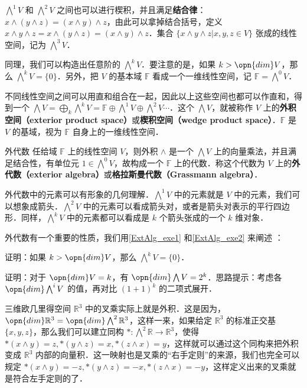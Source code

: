$\bigwedge^1 V$ 和 $\bigwedge^2 V$ 之间也可以进行楔积，并且满足\textbf{结合律}：$x\wedge(y\wedge z)=(x\wedge y)\wedge z$，由此可以拿掉结合括号，定义 $x\wedge y\wedge z=x\wedge(y\wedge z)=(x\wedge y)\wedge z$．集合 $\{x\wedge y\wedge z|x, y, z\in V\}$ 张成的线性空间，记为 $\bigwedge^3 V$．

同理，我们可以构造出任意阶的 $\bigwedge^k V$．要注意的是，如果 $k>\opn{dim} V$，那么 $\bigwedge^k V=\{0\}$．另外，把 $V$ 的基本域 $\mathbb{F}$ 看成一个一维线性空间，记 $\mathbb{F}=\bigwedge^0 V$．

不同线性空间之间可以用直和组合在一起，因此以上这些空间也都可以作直和，得到一个 $\bigwedge V=\bigoplus_k\bigwedge^k V=\mathbb{F}\oplus\bigwedge^1V\oplus\bigwedge^2V\cdots$．这个 $\bigwedge V$，就被称作 $V$ 上的\textbf{外积空间（exterior product space）}或\textbf{楔积空间（wedge product space）}．$\mathbb{F}$ 是 $V$ 的基域，视为 $\mathbb{F}$ 自身上的一维线性空间．

\begin{theorem}{外代数}
任给域 $\mathbb{F}$ 上的线性空间 $V$，则外积 $\wedge$ 是一个 $\bigwedge V$ 上的向量乘法，并且满足结合性，有单位元 $1\in \bigwedge^0 V$，故构成一个 $\mathbb{F}$ 上的代数．称这个代数为 $V$ 上的\textbf{外代数（exterior algebra）}或\textbf{格拉斯曼代数（Grassmann algebra）}．
\end{theorem}

外代数中的元素可以有形象的几何理解．$\bigwedge^1 V$ 中的元素就是 $V$ 中的元素，我们可以想象成箭头．$\bigwedge^2 V$ 中的元素可以看成箭头对，或者是箭头对表示的平行四边形．同样，$\bigwedge^k V$ 中的元素都可以看成是 $k$ 个箭头张成的一个 $k$ 维对象．

外代数有一个重要的性质，我们用\autoref{ExtAlg_exe1} 和\autoref{ExtAlg_exe2} 来阐述 ：

\begin{exercise}{}\label{ExtAlg_exe1}
证明：如果 $k>\opn{dim} V$，那么 $\bigwedge^kV=\{0\}$．
\end{exercise}

\begin{exercise}{}\label{ExtAlg_exe2}
证明：对于 $\opn{dim} V=k$，有 $\opn{dim} \bigwedge V=2^k$．思路提示：考虑各 $\opn{dim}\bigwedge^iV$ 的值，再对比 $(1+1)^k$ 的二项式展开．
\end{exercise}




三维欧几里得空间 $\mathbb{R}^3$ 中的叉乘实际上就是外积．这是因为，$\opn{dim}\mathbb{R}^3=\opn{dim}\bigwedge^2\mathbb{R}^3$，这样一来，如果给定 $\mathbb{R}^3$ 的标准正交基 $\{x, y, z\}$，那么我们可以建立同构 $*: \bigwedge^2\mathbb{R}\rightarrow\mathbb{R}^3$，使得 $*(x\wedge y)=z, *(y\wedge z)=x, *(z\wedge x)=y$，这样就可以通过这个同构来把外积变成 $\mathbb{R}^3$ 内部的向量积．这一映射也是叉乘的“右手定则”的来源，我们也完全可以规定 $*(x\wedge y)=-z, *(y\wedge z)=-x, *(z\wedge x)=-y$，这样定义出来的叉乘就是符合左手定则的了．

